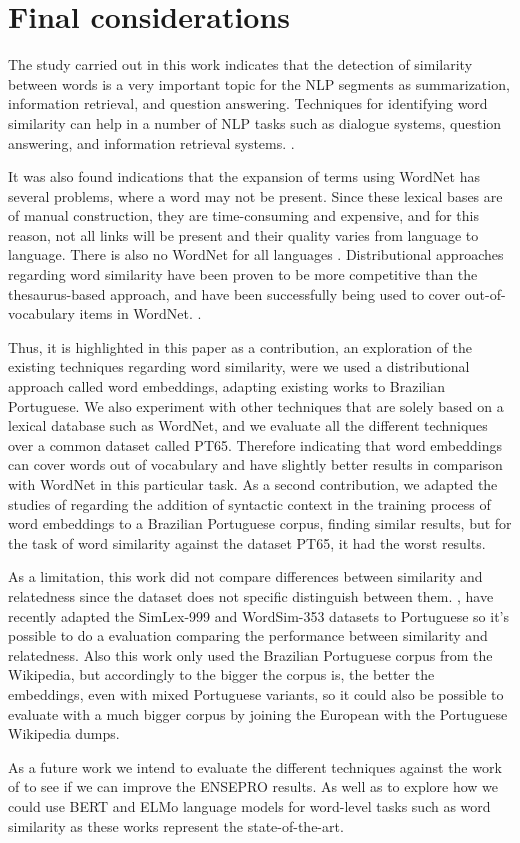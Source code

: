 \section{Final considerations}\label{chap:conclusions}

The study carried out in this work indicates that the detection of similarity between words is a very important topic for the NLP segments as summarization, information retrieval, and question answering. Techniques for identifying word similarity can help in a number of NLP tasks such as dialogue systems, question answering, and information retrieval systems. \cite{Islam2007ApplicationsOC,Pilehvar2013,Agirre2009}.

It was also found indications that the expansion of terms using WordNet has several problems, where a word may not be present. Since these lexical bases are of manual construction, they are time-consuming and expensive, and for this reason, not all links will be present and their quality varies from language to language.  There is also no WordNet for all languages \cite{Leeuwenberga2016}. Distributional approaches regarding word similarity have been proven to be more competitive than the thesaurus-based approach, and have been successfully being used to cover out-of-vocabulary items in WordNet.  \cite{gonccalo2018distributional, Agirre2009}.

Thus, it is highlighted in this paper as a contribution, an exploration of the existing techniques regarding word similarity, were we used a distributional approach called word embeddings, adapting existing works to Brazilian Portuguese. We also experiment with other techniques that are solely based on a lexical database such as WordNet, and we evaluate all the different techniques over a common dataset called PT65. Therefore indicating that word embeddings can cover words out of vocabulary and have slightly better results in comparison with WordNet in this particular task. As a second contribution, we adapted the studies of  regarding the addition of syntactic context in the training process of word embeddings to a Brazilian Portuguese corpus, finding similar results, but for the task of word similarity against the dataset PT65, it had the worst results.

As a limitation, this work did not compare differences between similarity and relatedness since the dataset does not specific distinguish between them. , have recently adapted the SimLex-999 and WordSim-353 datasets to Portuguese so it's possible to do a evaluation comparing the performance between similarity and relatedness. Also this work only used the Brazilian Portuguese corpus from the Wikipedia, but accordingly to  the bigger the corpus is, the better the embeddings, even with mixed Portuguese variants, so it could also be possible to evaluate with a much bigger corpus by joining the European with the Portuguese Wikipedia dumps.

As a future work we intend to evaluate the different techniques against the work of  to see if we can improve the ENSEPRO results. As well as to explore how we could use BERT and ELMo language models for word-level tasks such as word similarity as these works represent the state-of-the-art.
